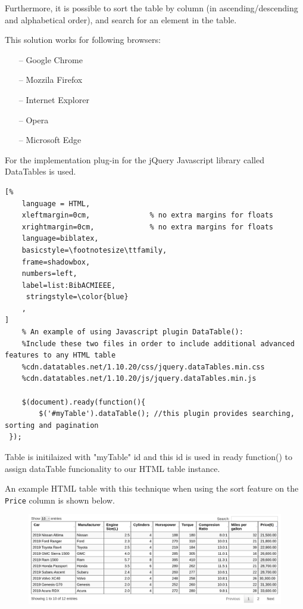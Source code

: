 \begin{itemize}
Furthermore, it is possible to sort the table by column (in ascending/descending and alphabetical order), and search for an element in the table.

This solution works for following browsers:
\begin{itemize}
    \item[--] Google Chrome
    \item[--] Mozzila Firefox
    \item[--] Internet Explorer
    \item[--] Opera
    \item[--] Microsoft Edge
\end{itemize}

For the implementation plug-in for the jQuery Javascript library called DataTables is used\parencite{PG_1}.


\begin{lstlisting}[%
    language = HTML,
    xleftmargin=0cm,              % no extra margins for floats
    xrightmargin=0cm,             % no extra margins for floats
    language=biblatex,
    basicstyle=\footnotesize\ttfamily,
    frame=shadowbox,
    numbers=left,
    label=list:BibACMIEEE,
     stringstyle=\color{blue}
    ,
]
    % An example of using Javascript plugin DataTable():
    %Include these two files in order to include additional advanced features to any HTML table
    %cdn.datatables.net/1.10.20/css/jquery.dataTables.min.css
    %cdn.datatables.net/1.10.20/js/jquery.dataTables.min.js

    $(document).ready(function(){
        $('#myTable').dataTable(); //this plugin provides searching, sorting and pagination
 });

\end{lstlisting}

Table is initilaized with "myTable" id and this id is used in
 ready function() to assign dataTable funcionality to our HTML table instance\parencite{PG}.

An example HTML table with this technique when using the sort feature on the \texttt{Price} column is shown below.
\begin{figure}[H]
    \centering

    {%
    \includegraphics[width=\linewidth]
    {pagination_2.png}%
    \label{alig1}%
    }



\end{figure}
\end{itemize}

